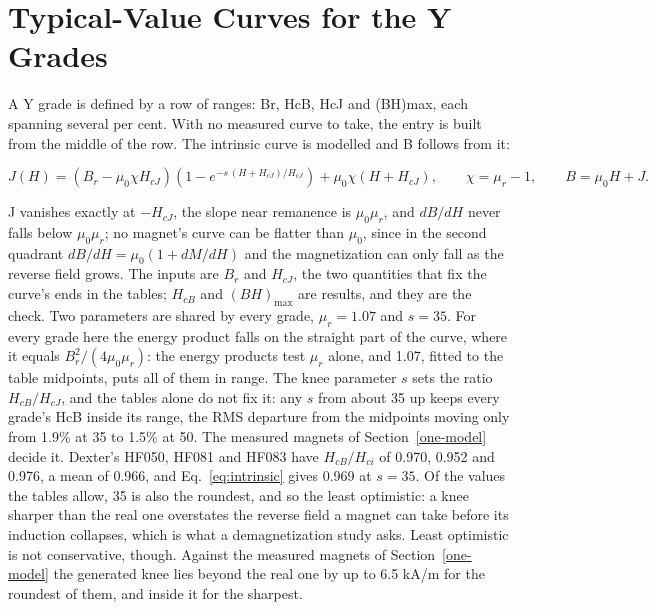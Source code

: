\documentclass[
  11pt,
]{article}
\begin{document}
\section{Typical-Value Curves for the Y Grades}\label{typical}

A Y grade is defined by a row of ranges: Br, HcB, HcJ and (BH)max, each spanning several per cent. With no measured curve to take, the entry is built from the middle of the row. The intrinsic curve is modelled and B follows from it:

\begin{equation}\label{eq:intrinsic}
J(H) = \left(B_r - \mu_0 \chi H_{cJ}\right)\left(1 - e^{-s\,(H + H_{cJ})/H_{cJ}}\right) + \mu_0 \chi \left(H + H_{cJ}\right), \qquad \chi = \mu_r - 1, \qquad B = \mu_0 H + J.
\end{equation}

J vanishes exactly at \(-H_{cJ}\), the slope near remanence is \(\mu_0\mu_r\), and \(dB/dH\) never falls below \(\mu_0\mu_r\); no magnet's curve can be flatter than \(\mu_0\), since in the second quadrant \(dB/dH = \mu_0(1 + dM/dH)\) and the magnetization can only fall as the reverse field grows. The inputs are \(B_r\) and \(H_{cJ}\), the two quantities that fix the curve's ends in the tables; \(H_{cB}\) and \((BH)_{\max}\) are results, and they are the check. Two parameters are shared by every grade, \(\mu_r = 1.07\) and \(s = 35\). For every grade here the energy product falls on the straight part of the curve, where it equals \(B_r^2/(4\mu_0\mu_r)\): the energy products test \(\mu_r\) alone, and 1.07, fitted to the table midpoints, puts all of them in range. The knee parameter \(s\) sets the ratio \(H_{cB}/H_{cJ}\), and the tables alone do not fix it: any \(s\) from about 35 up keeps every grade's HcB inside its range, the RMS departure from the midpoints moving only from 1.9\% at 35 to 1.5\% at 50. The measured magnets of Section~\ref{one-model} decide it. Dexter's HF050, HF081 and HF083 have \(H_{cB}/H_{ci}\) of 0.970, 0.952 and 0.976, a mean of 0.966, and Eq.~\eqref{eq:intrinsic} gives 0.969 at \(s = 35\). Of the values the tables allow, 35 is also the roundest, and so the least optimistic: a knee sharper than the real one overstates the reverse field a magnet can take before its induction collapses, which is what a demagnetization study asks. Least optimistic is not conservative, though. Against the measured magnets of Section~\ref{one-model} the generated knee lies beyond the real one by up to 6.5 kA/m for the roundest of them, and inside it for the sharpest.
\end{document}
